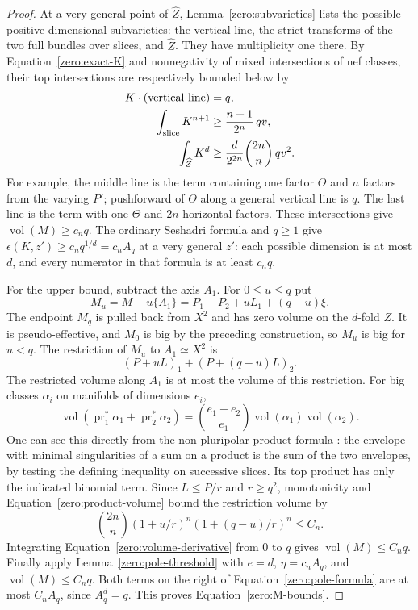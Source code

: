 \begin{proof}
At a very general point of \(\widehat Z\), Lemma~\ref{zero:subvarieties}
lists the possible positive-dimensional subvarieties: the vertical line,
the strict transforms of the two full bundles over slices, and
\(\widehat Z\).  They have multiplicity one there.  By
Equation~\eqref{zero:exact-K} and nonnegativity of mixed intersections of nef
classes, their top intersections are respectively bounded below by
\begin{align}
 K\cdot(\text{vertical line})&=q, \notag\\
 \int_{\text{slice}}K^{n+1}
  &\ge \frac{n+1}{2^n}\,qv,\label{zero:K-intersections}\\
 \int_{\widehat Z}K^d
  &\ge \frac{d}{2^{2n}}\binom{2n}{n}\,qv^2. \notag
\end{align}
For example, the middle line is the term containing one factor
\(\Theta\) and \(n\) factors from the varying \(P'\); pushforward of
\(\Theta\) along a general vertical line is \(q\).  The last line is the
term with one \(\Theta\) and \(2n\) horizontal factors.  These
intersections give \(\operatorname{vol}(M)\ge c_nq\).  The ordinary Seshadri formula
and \(q\ge1\) give
\(\epsilon(K,z')\ge c_nq^{1/d}=c_nA_q\) at a very general \(z'\):
each possible dimension is at most \(d\), and every numerator in that
formula is at least \(c_nq\).

For the upper bound, subtract the axis \(A_1\).  For \(0\le u\le q\) put
\[
 M_u=M-u\{A_1\}
     =P_1+P_2+uL_1+(q-u)\xi .
\]
The endpoint \(M_q\) is pulled back from \(X^2\) and has zero volume on
the \(d\)-fold \(Z\).  It is pseudo-effective, and \(M_0\) is big by
the preceding construction, so \(M_u\) is big for \(u<q\).  The
restriction of \(M_u\) to \(A_1\simeq X^2\) is
\[
 (P+uL)_1+(P+(q-u)L)_2.
\]
The restricted volume along \(A_1\) is at most the volume of this
restriction.  For big classes \(\alpha_i\) on manifolds of dimensions
\(e_i\),
\begin{equation}\label{zero:product-volume}
 \operatorname{vol}(\operatorname{pr}_1^*\alpha_1+\operatorname{pr}_2^*\alpha_2)
   =\binom{e_1+e_2}{e_1}\operatorname{vol}(\alpha_1)\operatorname{vol}(\alpha_2).
\end{equation}
One can see this directly from the non-pluripolar product formula
\cite{BEGZ2010}: the
envelope with minimal singularities of a sum on a product is the sum
of the two envelopes, by testing the defining inequality on successive
slices.  Its top product has only the indicated binomial term.  Since
\(L\le P/r\) and \(r\ge q^2\), monotonicity and
Equation~\eqref{zero:product-volume} bound the restriction volume by
\[
 \binom{2n}{n}(1+u/r)^n(1+(q-u)/r)^n\le C_n.
\]
Integrating Equation~\eqref{zero:volume-derivative} from \(0\) to \(q\) gives
\(\operatorname{vol}(M)\le C_nq\).  Finally apply
Lemma~\ref{zero:pole-threshold} with \(e=d\),
\(\eta=c_nA_q\), and \(\operatorname{vol}(M)\le C_nq\).
Both terms on the right of Equation~\eqref{zero:pole-formula} are at most
\(C_nA_q\), since \(A_q^d=q\).  This proves Equation~\eqref{zero:M-bounds}.
\end{proof}

